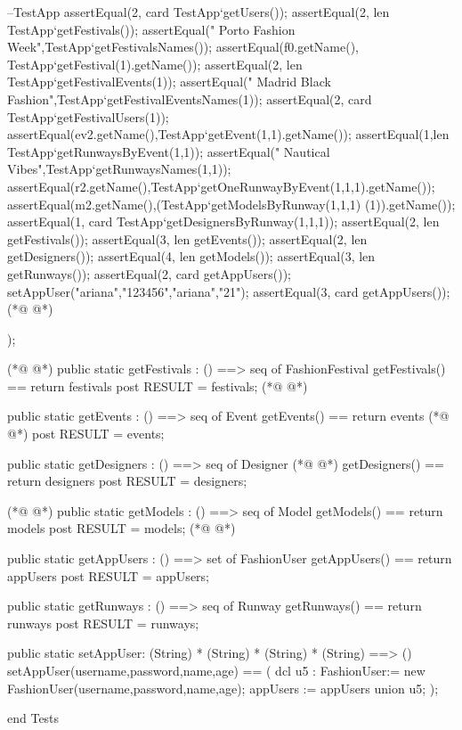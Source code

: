 \begin{vdmpp}[breaklines=true]
     --TestApp
      assertEqual(2, card TestApp`getUsers());
      assertEqual(2, len TestApp`getFestivals());
      assertEqual(" Porto Fashion Week\n",TestApp`getFestivalsNames());
      assertEqual(f0.getName(), TestApp`getFestival(1).getName());
     assertEqual(2, len TestApp`getFestivalEvents(1));
     assertEqual(" Madrid Black Fashion",TestApp`getFestivalEventsNames(1));
     assertEqual(2, card TestApp`getFestivalUsers(1));
     assertEqual(ev2.getName(),TestApp`getEvent(1,1).getName());
    assertEqual(1,len TestApp`getRunwaysByEvent(1,1));
    assertEqual(" Nautical Vibes",TestApp`getRunwaysNames(1,1));
    assertEqual(r2.getName(),TestApp`getOneRunwayByEvent(1,1,1).getName());
    assertEqual(m2.getName(),(TestApp`getModelsByRunway(1,1,1) (1)).getName());
    assertEqual(1, card TestApp`getDesignersByRunway(1,1,1));
    assertEqual(2, len getFestivals());
    assertEqual(3, len getEvents());
    assertEqual(2, len getDesigners());
    assertEqual(4, len getModels());
    assertEqual(3, len getRunways());
    assertEqual(2, card getAppUsers());
    setAppUser("ariana","123456","ariana","21");
    assertEqual(3, card getAppUsers());
(*@
\label{getFestivals:207}
@*)
    
  );
  
(*@
\label{getEvents:210}
@*)
  public  static getFestivals : () ==> seq of FashionFestival
  getFestivals() == return festivals
  post RESULT = festivals;
(*@
\label{getDesigners:213}
@*)
  
  public  static getEvents : () ==> seq of Event
  getEvents() == return events
(*@
\label{getModels:216}
@*)
  post RESULT = events;
  
  public  static getDesigners : () ==> seq of Designer
(*@
\label{getAppUsers:219}
@*)
  getDesigners() == return designers
  post RESULT = designers;
   
(*@
\label{getRunways:222}
@*)
 public  static getModels : () ==> seq of Model
  getModels() == return models
  post RESULT = models;
(*@
\label{setAppUser:225}
@*)
    
  public  static getAppUsers : () ==> set of FashionUser
  getAppUsers() == return appUsers
  post RESULT = appUsers;
    
  public  static getRunways : () ==> seq of Runway
  getRunways() == return runways
  post RESULT = runways;
    
  public static setAppUser: (String) *  (String) * (String) * (String) ==> ()
  setAppUser(username,password,name,age) == 
  (
   dcl u5 : FashionUser:= new FashionUser(username,password,name,age);
   appUsers := appUsers union {u5};
   );
   
 
 
end Tests
\end{vdmpp}

